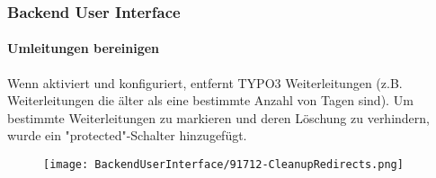 %

\begin{frame}[fragile]
	\frametitle{Backend User Interface}
	\framesubtitle{Umleitungen bereinigen}

	Wenn aktiviert und konfiguriert, entfernt TYPO3 Weiterleitungen (z.B. Weiterleitungen
	die älter als eine bestimmte Anzahl von Tagen sind).
	Um bestimmte Weiterleitungen zu markieren und deren Löschung zu verhindern, wurde ein "protected"-Schalter
	hinzugefügt.

	\begin{figure}
		\texttt{[image: BackendUserInterface/91712-CleanupRedirects.png]}
	\end{figure}

\end{frame}

